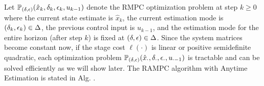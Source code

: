 Let $\mathbb{P}_{(\delta,\epsilon)}(\hat{x}_{k},\delta_{k},\epsilon_{k},u_{k -1})$
denote the RMPC optimization problem at step $k\geq0$ where the current
state estimate is $\hat{x}_{k}$, the current estimation mode is $(\delta_k,\epsilon_k)\in\Delta$,
the previous control input is $u_{k-1}$, and the estimation mode
for the entire horizon (after step $k$) is fixed at $(\delta,\epsilon)\in\Delta$.
Since the system matrices become constant now, if the stage cost $\ell(\cdot)$
is linear or positive semidefinite quadratic, each optimization problem
$\mathbb{P}_{(\delta,\epsilon)}(\hat{x}_{\cdot},\delta_{\cdot},\epsilon_{\cdot},u_{\cdot -1})$ is tractable and can be solved
efficiently as we will show later. 
The RAMPC algorithm with Anytime Estimation is stated in Alg. \algoref.
